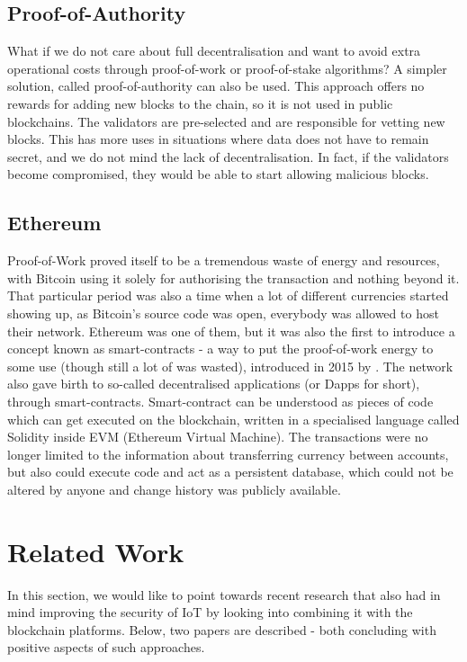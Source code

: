 \subsection{Proof-of-Authority}\label{sec:poa}
What if we do not care about full decentralisation and want to avoid extra operational costs through proof-of-work or proof-of-stake algorithms? A simpler solution, called proof-of-authority \cite{network2017proof} can also be used. This approach offers no rewards for adding new blocks to the chain, so it is not used in public blockchains. The validators are pre-selected and are responsible for vetting new blocks. This has more uses in situations where data does not have to remain secret, and we do not mind the lack of decentralisation. In fact, if the validators become compromised, they would be able to start allowing malicious blocks.
\subsection{Ethereum}
Proof-of-Work proved itself to be a tremendous waste of energy and resources, with Bitcoin using it solely for authorising the transaction and nothing beyond it. That particular period was also a time when a lot of different currencies started showing up, as Bitcoin's source code was open, everybody was allowed to host their network. Ethereum was one of them, but it was also the first to introduce a concept known as smart-contracts - a way to put the proof-of-work energy to some use (though still a lot of was wasted), introduced in 2015 by \citet{buterin2014ethereum}. The network also gave birth to so-called decentralised applications (or Dapps for short), through smart-contracts. Smart-contract can be understood as pieces of code which can get executed on the blockchain, written in a specialised language called Solidity inside EVM (Ethereum Virtual Machine). The transactions were no longer limited to the information about transferring currency between accounts, but also could execute code and act as a persistent database, which could not be altered by anyone and change history was publicly available.


\section{Related Work}
In this section, we would like to point towards recent research that also had in mind improving the security of IoT by looking into combining it with the blockchain platforms. Below, two papers are described - both concluding with positive aspects of such approaches.

